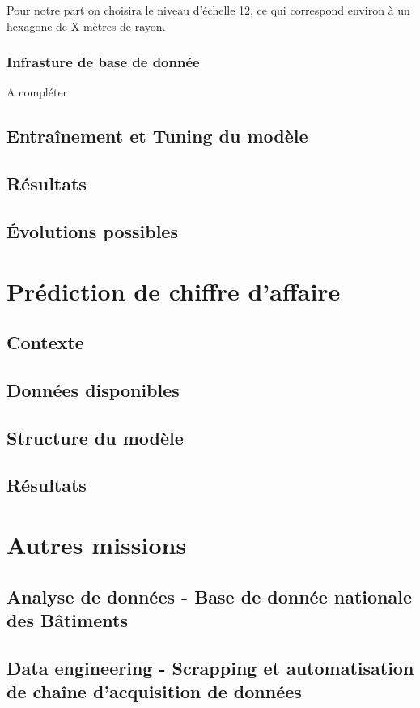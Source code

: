Pour notre part on choisira le niveau d'échelle 12, ce qui correspond environ à un hexagone de X mètres de rayon.

\subsubsection{Infrasture de base de donnée}

A compléter

\subsection{Entraînement et Tuning du modèle}

\subsection{Résultats}

\subsection{\'Evolutions possibles}

\section{Prédiction de chiffre d'affaire}

\subsection{Contexte}

\subsection{Données disponibles}

\subsection{Structure du modèle}

\subsection{Résultats}

\section{Autres missions}

\subsection{Analyse de données - Base de donnée nationale des Bâtiments}

\subsection{Data engineering - Scrapping et automatisation de chaîne d'acquisition de données}